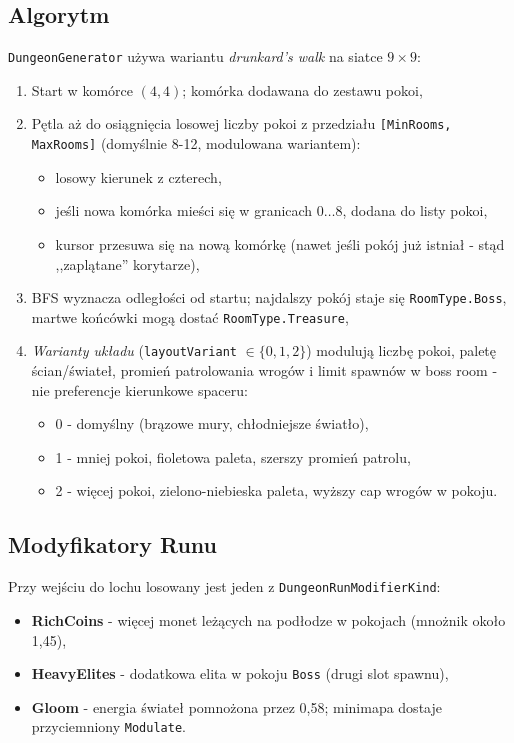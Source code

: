 \subsection{Algorytm}

\texttt{DungeonGenerator} używa wariantu \textit{drunkard's walk} na siatce $9 \times 9$:

\begin{enumerate}
    \item Start w komórce $(4,4)$; komórka dodawana do zestawu pokoi,
    \item Pętla aż do osiągnięcia losowej liczby pokoi z przedziału \texttt{[MinRooms, MaxRooms]} (domyślnie 8-12, modulowana wariantem):
    \begin{itemize}
        \item losowy kierunek z czterech,
        \item jeśli nowa komórka mieści się w granicach $0\ldots 8$, dodana do listy pokoi,
        \item kursor przesuwa się na nową komórkę (nawet jeśli pokój już istniał - stąd ,,zaplątane'' korytarze),
    \end{itemize}
    \item BFS wyznacza odległości od startu; najdalszy pokój staje się \texttt{RoomType.Boss}, martwe końcówki mogą dostać \texttt{RoomType.Treasure},
    \item \emph{Warianty układu} (\texttt{layoutVariant} $\in \{0,1,2\}$) modulują liczbę pokoi, paletę ścian/świateł, promień patrolowania wrogów i limit spawnów w boss room - nie preferencje kierunkowe spaceru:
    \begin{itemize}
        \item 0 - domyślny (brązowe mury, chłodniejsze światło),
        \item 1 - mniej pokoi, fioletowa paleta, szerszy promień patrolu,
        \item 2 - więcej pokoi, zielono-niebieska paleta, wyższy cap wrogów w pokoju.
    \end{itemize}
\end{enumerate}

\subsection{Modyfikatory Runu}

Przy wejściu do lochu losowany jest jeden z \texttt{DungeonRunModifierKind}:
\begin{itemize}
    \item \textbf{RichCoins} - więcej monet leżących na podłodze w pokojach (mnożnik około 1,45),
    \item \textbf{HeavyElites} - dodatkowa elita w pokoju \texttt{Boss} (drugi slot spawnu),
    \item \textbf{Gloom} - energia świateł pomnożona przez 0,58; minimapa dostaje przyciemniony \texttt{Modulate}.
\end{itemize}

